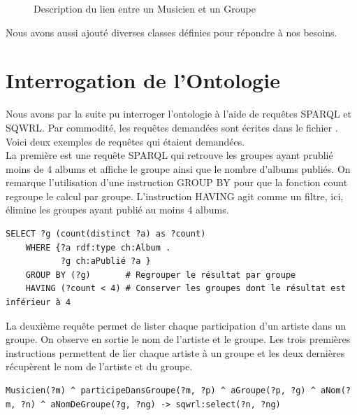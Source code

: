 \documentclass{article}
\begin{document}
\begin{figure}[H]
    \centering
    \caption{Description du lien entre un \textsf{Musicien} et un \textsf{Groupe}} 
\end{figure}

Nous avons aussi ajouté diverses classes définies pour répondre à nos besoins.

\section{Interrogation de l'Ontologie}
Nous avons par la suite pu interroger l'ontologie à l'aide de requêtes SPARQL et SQWRL. Par commodité, les requêtes demandées sont écrites dans le fichier . Voici deux exemples de requêtes qui étaient demandées.\\

La première est une requête SPARQL qui retrouve les groupes ayant prublié moins de 4 albums et affiche le groupe ainsi que le nombre d'albums publiés. On remarque l'utilisation d'une instruction \textsf{GROUP BY} pour que la fonction \textsf{count} regroupe le calcul par groupe. L'instruction \textsf{HAVING} agit comme un filtre, ici, élimine les groupes ayant publié au moins 4 albums.

\begin{lstlisting}[H]
    SELECT ?g (count(distinct ?a) as ?count)
    WHERE {?a rdf:type ch:Album .
           ?g ch:aPublié ?a }
    GROUP BY (?g)       # Regrouper le résultat par groupe
    HAVING (?count < 4) # Conserver les groupes dont le résultat est inférieur à 4 
    \end{lstlisting}

La deuxième requête permet de lister chaque participation d'un artiste dans un groupe. On observe en sortie le nom de l'artiste et le groupe. Les trois premières instructions permettent de lier chaque artiste à un groupe et les deux dernières récupèrent le nom de l'artiste et du groupe.

\begin{lstlisting}[H]
Musicien(?m) ^ participeDansGroupe(?m, ?p) ^ aGroupe(?p, ?g) ^ aNom(?m, ?n) ^ aNomDeGroupe(?g, ?ng) -> sqwrl:select(?n, ?ng)
\end{lstlisting}
\end{document}
